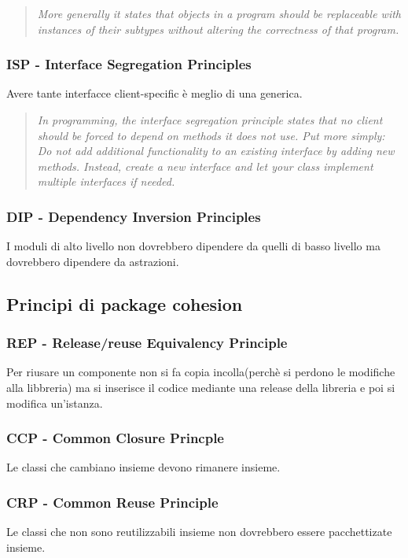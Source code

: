 \documentclass{article}
\begin{document}
\begin{quotation}
    \textit{
        More generally it states that objects in a program should be replaceable with instances of their subtypes
without altering the correctness of that program.
    }
\end{quotation}
\subsubsection{ISP - Interface Segregation Principles}
Avere tante interfacce client-specific è meglio di una generica.

\begin{quotation}
    \textit{
        In programming, the interface segregation principle states that no client should be forced to depend on
methods it does not use. Put more simply: Do not add additional functionality to an existing interface by
adding new methods. Instead, create a new interface and let your class implement multiple interfaces if
needed.
    }
\end{quotation}

\subsubsection{DIP - Dependency Inversion Principles}
I moduli di alto livello non dovrebbero dipendere da quelli di basso livello
ma dovrebbero dipendere da astrazioni.

\subsection{Principi di package cohesion}
\subsubsection{REP - Release/reuse Equivalency Principle}
Per riusare un componente non si fa copia incolla(perchè si perdono le modifiche alla libbreria) ma 
si inserisce il codice mediante una release della libreria e poi si modifica un'istanza.

\subsubsection{CCP - Common Closure Princple}
Le classi che cambiano insieme devono rimanere insieme.

\subsubsection{CRP - Common Reuse Principle}
Le classi che non sono reutilizzabili insieme non dovrebbero essere pacchettizate insieme.
\end{document}
